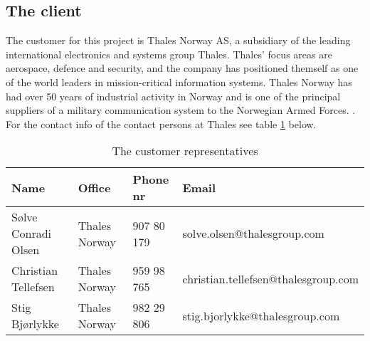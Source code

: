 \subsection{The client}
The customer for this project is Thales Norway AS, a subsidiary of the leading international electronics and systems group Thales. Thales' focus areas are aerospace, defence and security, and the company has positioned themself as one of the world leaders in mission-critical information systems. Thales Norway has had over 50 years of industrial activity in Norway and is one of the principal suppliers of a military communication system to the Norwegian Armed Forces.
\cite{bib:thales}.
\newline
\newline
For the contact info of the contact persons at Thales see table \ref{tab:customer} below.
\begin{table}[h!]
\begin{center}
\begin{tabular}{l|l|l|l}
\hline
\textbf{Name} & \textbf{Office} & \textbf{Phone nr} & \textbf{Email} \\ \hline \hline
Sølve Conradi Olsen & Thales Norway & 907 80 179 & solve.olsen@thalesgroup.com \\ 
Christian Tellefsen & Thales Norway & 959 98 765 & christian.tellefsen@thalesgroup.com \\ 
Stig Bjørlykke & Thales Norway & 982 29 806 & stig.bjorlykke@thalesgroup.com \\ \hline
\end{tabular}
\end{center}
\caption{The customer representatives} \label{tab:customer}
\end{table}

